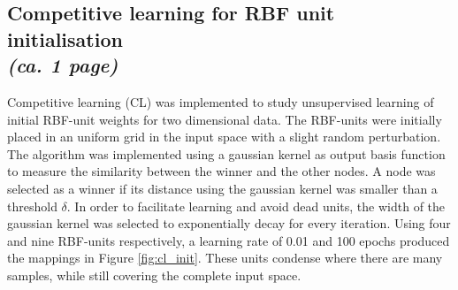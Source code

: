 \documentclass[a4paper]{article}
\begin{document}
\subsection{Competitive learning for RBF unit initialisation\\ \normalsize{\textit{(ca. 1 page)}}}
Competitive learning (CL) was implemented to study unsupervised learning of initial RBF-unit weights for two dimensional data. The RBF-units were initially placed in an uniform grid in the input space with a slight random perturbation. The algorithm was implemented using a gaussian kernel as output basis function to measure the similarity between the winner and the other nodes. A node was selected as a winner if its distance using the gaussian kernel was smaller than a threshold $\delta$. In order to facilitate learning and avoid dead units, the width of the gaussian kernel was selected to exponentially decay for every iteration. Using four and nine RBF-units respectively, a learning rate of 0.01 and 100 epochs produced the mappings in Figure \ref{fig:cl_init}. These units condense where there are many samples, while still covering the complete input space.
\end{document}
